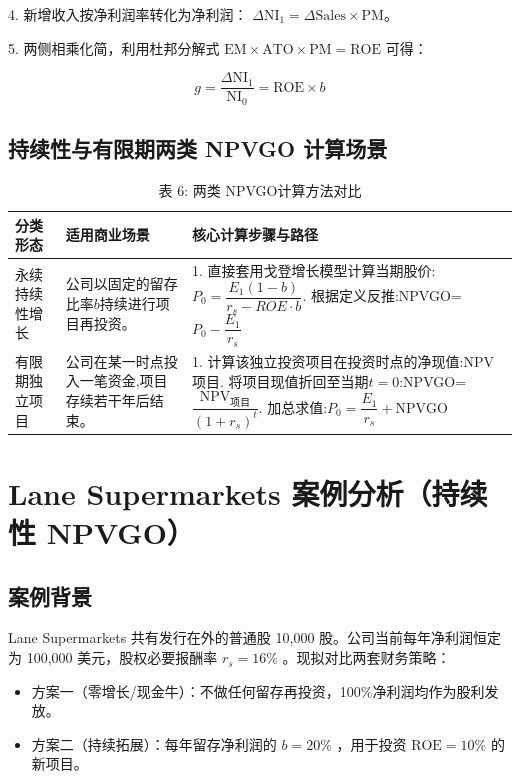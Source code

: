 \documentclass[lang=cn,10pt,color=blue]{elegantbook}
\begin{document}
4. 新增收入按净利润率转化为净利润： $\Delta \mathrm { N I } _ { 1 } = \Delta \mathrm { S } \mathrm { a l e s } \times \mathrm { P M }$。 

5. 两侧相乘化简，利用杜邦分解式 $\mathrm { E M } \times \mathrm { A T O } \times \mathrm { P M } = \mathrm { R O E }$ 可得： 

$$
g = \frac {\Delta \mathrm {N I} _ {1}}{\mathrm {N I} _ {0}} = \mathrm {R O E} \times b
$$

\subsection{持续性与有限期两类 NPVGO 计算场景}

\begin{table}[ht]
  \centering
  \caption{表 6: 两类 NPVGO计算方法对比}
  \renewcommand{\arraystretch}{1.4}
\begin{tabularx}{\textwidth}{lYY}
  \toprule
  分类形态 & 适用商业场景 & 核心计算步骤与路径 \\
  \midrule
  永续持续性增长 & 公司以固定的留存比率$b$持续进行项目再投资。 & 1. 直接套用戈登增长模型计算当期股价:$P_0 = \dfrac{E_1(1-b)}{r_s - ROE \cdot b}$. 根据定义反推:NPVGO=$P_0 - \dfrac{E_1}{r_s}$ \\
  有限期独立项目 & 公司在某一时点投入一笔资金,项目存续若干年后结束。 & 1. 计算该独立投资项目在投资时点的净现值:NPV项目. 将项目现值折回至当期$t = 0$:NPVGO=$\dfrac{\text{NPV}_{\text{项目}}}{(1 + r_s)^t}$. 加总求值:$P_0 = \dfrac{E_1}{r_s} + \text{NPVGO}$ \\
  \bottomrule
\end{tabularx}
\end{table}

\section{Lane Supermarkets 案例分析（持续性 NPVGO）}

\subsection{案例背景}

Lane Supermarkets 共有发行在外的普通股 10,000 股。公司当前每年净利润恒定为 100,000 美元，股权必要报酬率 $r _ { s } = 1 6 \%$ 。现拟对比两套财务策略： 

\begin{itemize}
  \item 方案一（零增长/现金牛）：不做任何留存再投资，100\%净利润均作为股利发放。

  \item 方案二（持续拓展）：每年留存净利润的 $b = 2 0 \%$ ，用于投资 $\mathrm { R O E } = 1 0 \%$ 的新项目。
\end{itemize}
\end{document}
